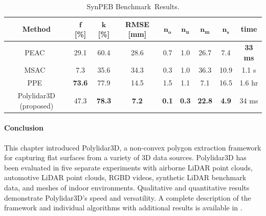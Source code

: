 \begin{table}[H]
\centering
\caption{SynPEB Benchmark~Results.  }
\label{table:synpeb_results}
\begin{tabular}{@{}ccccccccc@{}}
\toprule
\textbf{Method}                                  & $\textbf{f}$ {\textbf{[}}\textbf{\%}{\textbf{]}} & $\textbf{k}$ {\textbf{[}}\textbf{\%}{\textbf{]}} & \textbf{RMSE} {\textbf{[}}\textbf{mm}{\textbf{]}} & $\textbf{n}_\textbf{o}$ & $\textbf{n}_\textbf{u}$ & $\textbf{n}_\textbf{m}$ & $\textbf{n}_\textbf{s}$ & \textbf{time}\\ \midrule
PEAC~\cite{feng_fast_2014}              & 29.1         & 60.4         & 28.6          & 0.7   & 1.0   & 26.7  & 7.4   & \textbf{33 ms}\\
MSAC~\cite{torr_mlesac_2000}            & 7.3          & 35.6         & 34.3          & 0.3   & 1.0   & 36.3  & 10.9  & 1.1 s\\
PPE~\cite{schaefer_maximum_2019}      & \textbf{73.6}         & 77.9         & 14.5          & 1.5   & 1.1   & 7.1   & 16.5  & 1.6 hr\\
Polylidar3D (proposed)                  & 47.3         & \textbf{78.3}         & \textbf{7.2}           & \textbf{0.1}   & \textbf{0.3}   & \textbf{22.8}  & \textbf{4.9}  & 34 ms\\ \bottomrule
\end{tabular}
\end{table}


\paragraph{Conclusion}
This chapter introduced Polylidar3D, a non-convex polygon extraction framework for capturing flat surfaces from a variety of 3D data sources. Polylidar3D has been evaluated in five separate experiments with airborne LiDAR point clouds, automotive LiDAR point clouds, RGBD videos, synthetic LiDAR benchmark data, and meshes of indoor environments. Qualitative and quantitative results demonstrate Polylidar3D's speed and versatility. A complete description of the framework and individual algorithms with additional results is available in \cite{castagno_polylidar3d_2020}.


